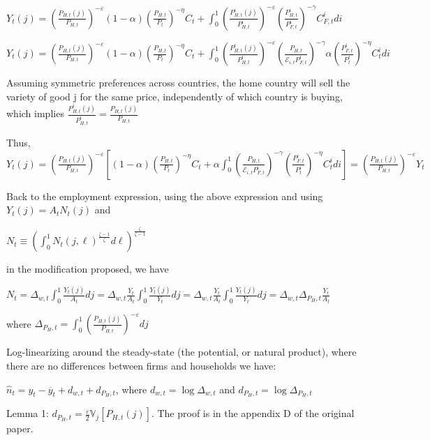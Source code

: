 \documentclass[
]{article}
\begin{document}
\(\displaystyle Y_t(j) = \left( \frac{P_{H,t}(j)}{P_{H,t}}\right)^{-\varepsilon} (1-\alpha)\left( \frac{P_{H,t}}{P_t} \right)^{-\eta}C_t + \int_0^1 \left( \frac{P_{H,t}^i(j)}{P_{H,t}^i}\right)^{-\varepsilon} \left( \frac{P_{H,t}^i}{P_{F,t}^i}\right)^{-\gamma}C_{F,t}^i di\)

\(\displaystyle Y_t(j) = \left( \frac{P_{H,t}(j)}{P_{H,t}}\right)^{-\varepsilon} (1-\alpha)\left( \frac{P_{H,t}}{P_t} \right)^{-\eta}C_t + \int_0^1 \left( \frac{P_{H,t}^i(j)}{P_{H,t}^i}\right)^{-\varepsilon} \left( \frac{P_{H,t}}{\mathcal{E}_{i,t}P_{F,t}^i}\right)^{-\gamma} \alpha \left( \frac{P_{F,t}^i}{P_t^i} \right)^{-\eta} C_t^i di\)

Assuming symmetric preferences across countries, the home country will
sell the variety of good j for the same price, independently of which
country is buying, which implies
\(\displaystyle \frac{P_{H,t}^i (j)}{P_{H,t}^i}=\frac{P_{H,t} (j)}{P_{H,t}}\)

Thus,
\(\displaystyle Y_t(j) = \left( \frac{P_{H,t}(j)}{P_{H,t}}\right)^{-\varepsilon} \left[ (1-\alpha)\left( \frac{P_{H,t}}{P_t} \right)^{-\eta}C_t + \alpha \int_0^1 \left( \frac{P_{H,t}}{\mathcal{E}_{i,t}P_{F,t}^i}\right)^{-\gamma} \left( \frac{P_{F,t}^i}{P_t^i} \right)^{-\eta} C_t^i di \right] = \left( \frac{P_{H,t}(j)}{P_{H,t}}\right)^{-\varepsilon}Y_t\)

Back to the employment expression, using the above expression and using
\(Y_t(j)=A_tN_t(j)\) and

\(\displaystyle N_t \equiv \left(\int_0^1 N_t(j,\ell)^{\frac{\zeta-1}{\zeta}} d\ell \right)^{\frac{\zeta}{\zeta-1}}\)

in the modification proposed, we have

\(\displaystyle N_t= \Delta_{w,t} \int_0^1 \frac{Y_t(j)}{A_t}dj= \Delta_{w,t} \frac{Y_t}{A_t}\int_0^1 \frac{Y_t(j)}{Y_t}dj = \Delta_{w,t} \frac{Y_t}{A_t}\int_0^1 \frac{Y_t(j)}{Y_t}dj=\Delta_{w,t} \Delta_{P_H,t}\frac{Y_t}{A_t}\)

where
\(\Delta_{P_H,t}=\int_0^1 \left( \frac{P_{H,t}(j)}{P_{H,t}}\right)^{-\varepsilon}dj\)

Log-linearizing around the steady-state (the potential, or natural
product), where there are no differences between firms and households we
have:

\(\widehat{n}_t=y_t-\overline{y}_t+d_{w,t}+d_{P_H,t}\), where
\(d_{w,t}=\log \Delta_{w,t}\) and \(d_{P_H,t}=\log \Delta_{P_H,t}\)

Lemma 1:
\(\displaystyle d_{P_H,t}=\frac{\varepsilon}{2}\mathbb{V}_j[P_{H,t}(j)]\).
The proof is in the appendix D of the original paper.
\end{document}
